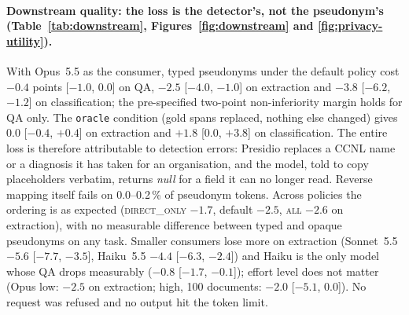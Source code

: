 \documentclass[11pt,a4paper]{article}
\newcommand{\pseud}[1]{\texttt{#1}}
\begin{document}
\paragraph{Downstream quality: the loss is the detector's, not the pseudonym's (Table~\ref{tab:downstream}, Figures~\ref{fig:downstream} and \ref{fig:privacy-utility}).} With Opus~5.5 as the consumer, typed pseudonyms under the default policy cost $-0.4$ points [$-1.0$, $0.0$] on QA, $-2.5$ [$-4.0$, $-1.0$] on extraction and $-3.8$ [$-6.2$, $-1.2$] on classification; the pre-specified two-point non-inferiority margin holds for QA only. The \pseud{oracle} condition (gold spans replaced, nothing else changed) gives $0.0$ [$-0.4$, $+0.4$] on extraction and $+1.8$ [$0.0$, $+3.8$] on classification. The entire loss is therefore attributable to detection errors: Presidio replaces a CCNL name or a diagnosis it has taken for an organisation, and the model, told to copy placeholders verbatim, returns \emph{null} for a field it can no longer read. Reverse mapping itself fails on 0.0--0.2\,\% of pseudonym tokens. Across policies the ordering is as expected (\textsc{direct\_only} $-1.7$, default $-2.5$, \textsc{all} $-2.6$ on extraction), with no measurable difference between typed and opaque pseudonyms on any task. Smaller consumers lose more on extraction (Sonnet~5.5 $-5.6$ [$-7.7$, $-3.5$], Haiku~5.5 $-4.4$ [$-6.3$, $-2.4$]) and Haiku is the only model whose QA drops measurably ($-0.8$ [$-1.7$, $-0.1$]); effort level does not matter (Opus low: $-2.5$ on extraction; high, 100 documents: $-2.0$ [$-5.1$, $0.0$]). No request was refused and no output hit the token limit.
\end{document}
